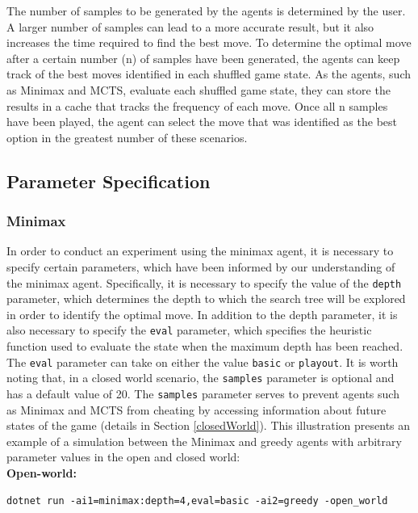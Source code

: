 The number of samples to be generated by the agents is determined by the user. A larger number of samples can lead to a more accurate result, but it also increases the time required to find the best move. To determine the optimal move after a certain number (n) of samples have been generated, the agents can keep track of the best moves identified in each shuffled game state. As the agents, such as Minimax and MCTS, evaluate each shuffled game state, they can store the results in a cache that tracks the frequency of each move. Once all n samples have been played, the agent can select the move that was identified as the best option in the greatest number of these scenarios.

\subsection{Parameter Specification}
\label{paramSpecification}

\subsubsection{Minimax}

In order to conduct an experiment using the minimax agent, it is necessary to specify certain parameters, which have been informed by our understanding of the minimax agent. Specifically, it is necessary to specify the value of the \texttt{depth} parameter, which determines the depth to which the search tree will be explored in order to identify the optimal move. In addition to the depth parameter, it is also necessary to specify the \texttt{eval} parameter, which specifies the heuristic function used to evaluate the state when the maximum depth has been reached. The \texttt{eval} parameter can take on either the value \texttt{basic} or \texttt{playout}. It is worth noting that, in a closed world scenario, the \texttt{samples} parameter is optional and has a default value of 20. The \texttt{samples} parameter serves to prevent agents such as Minimax and MCTS from cheating by accessing information about future states of the game (details in Section \ref{closedWorld}). This illustration presents an example of a simulation between the Minimax and greedy agents with arbitrary parameter values in the open and closed world:\\

\textbf{Open-world: }
\begin{lstlisting}
dotnet run -ai1=minimax:depth=4,eval=basic -ai2=greedy -open_world
\end{lstlisting}

